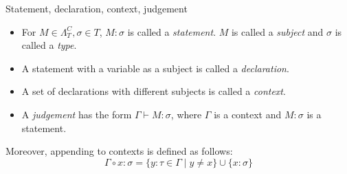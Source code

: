 \documentclass[main.tex]{subfiles}
\begin{document}
\begin{defn}
    Statement, declaration, context, judgement
    \begin{itemize}
        \item For $M \in \Lambda_T^C, \sigma \in T$, $M : \sigma$ is called
            a \emph{statement}. $M$ is called a \emph{subject} and $\sigma$
            is called a \emph{type}.
        \item A statement with a variable as a subject is called a \emph{declaration}.
        \item A set of declarations with different subjects is called a \emph{context}.
        \item A \emph{judgement} has the form $\Gamma \vdash M: \sigma$, where
            $\Gamma$ is a context and $M: \sigma$ is a statement.
    \end{itemize}

    Moreover, appending to contexts is defined as follows:
    \[ \Gamma \circ x : \sigma = \{ y : \tau \in \Gamma \mid y \neq x \}
       \cup \{ x : \sigma \} \]
\end{defn}
\end{document}

